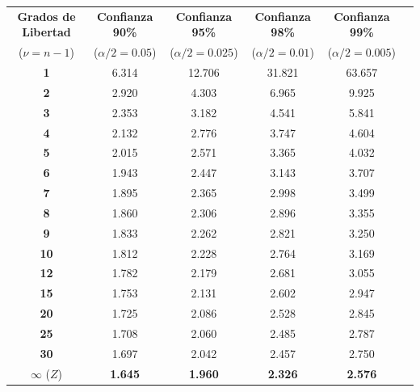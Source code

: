 \begin{center}
\small
\begin{tabular}{c|ccccc}
\toprule
\textbf{Grados de Libertad} & \textbf{Confianza 90\%} & \textbf{Confianza 95\%} & \textbf{Confianza 98\%} & \textbf{Confianza 99\%} \\
($\nu = n-1$) & ($\alpha/2 = 0.05$) & ($\alpha/2 = 0.025$) & ($\alpha/2 = 0.01$) & ($\alpha/2 = 0.005$) \\
\midrule
\textbf{1}  & 6.314 & 12.706 & 31.821 & 63.657 \\
\textbf{2}  & 2.920 & 4.303  & 6.965  & 9.925  \\
\textbf{3}  & 2.353 & 3.182  & 4.541  & 5.841  \\
\textbf{4}  & 2.132 & 2.776  & 3.747  & 4.604  \\
\textbf{5}  & 2.015 & 2.571  & 3.365  & 4.032  \\
\textbf{6}  & 1.943 & 2.447  & 3.143  & 3.707  \\
\textbf{7}  & 1.895 & 2.365  & 2.998  & 3.499  \\
\textbf{8}  & 1.860 & 2.306  & 2.896  & 3.355  \\
\textbf{9}  & 1.833 & 2.262  & 2.821  & 3.250  \\
\textbf{10} & 1.812 & 2.228  & 2.764  & 3.169  \\
\textbf{12} & 1.782 & 2.179  & 2.681  & 3.055  \\
\textbf{15} & 1.753 & 2.131  & 2.602  & 2.947  \\
\textbf{20} & 1.725 & 2.086  & 2.528  & 2.845  \\
\textbf{25} & 1.708 & 2.060  & 2.485  & 2.787  \\
\textbf{30} & 1.697 & 2.042  & 2.457  & 2.750  \\
$\boldsymbol{\infty}$ ($Z$) & \textbf{1.645} & \textbf{1.960} & \textbf{2.326} & \textbf{2.576} \\
\bottomrule
\end{tabular}
\end{center}
